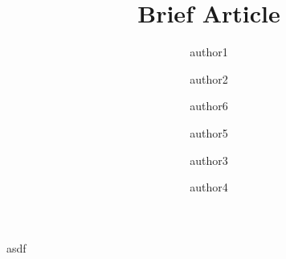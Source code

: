 \documentclass[11pt]{article}
\title{Brief Article}
\author{author1}
\author{author2}
\affil{al1}
\author{author6}
\affil{al6}
\author{author5}
\affil{al5}
\author{author3}
\author{author4}
\affil{al2}
\begin{document}
\maketitle

asdf
\end{document}
